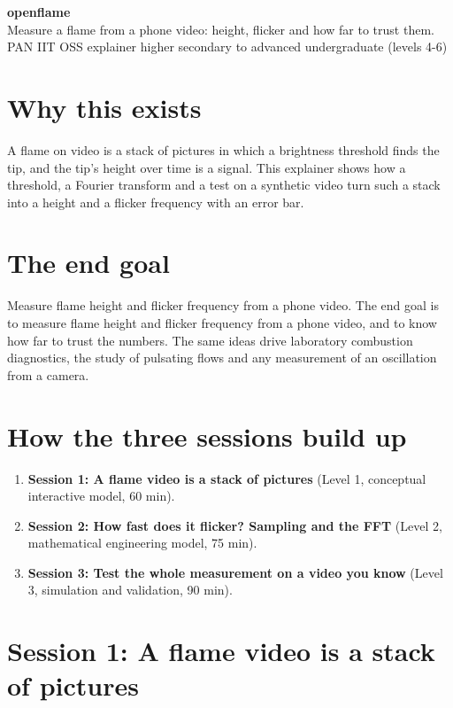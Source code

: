 \documentclass[11pt,a4paper]{article}
\begin{document}
\begin{center}{\LARGE\bfseries openflame}\\[0.4em]{\large Measure a flame from a phone video: height, flicker and how far to trust them.}\\[0.2em]\small PAN IIT OSS explainer \textbullet{} higher secondary to advanced undergraduate (levels 4-6)\end{center}

\section*{Why this exists}
A flame on video is a stack of pictures in which a brightness threshold finds the tip, and the tip's height over time is a signal. This explainer shows how a threshold, a Fourier transform and a test on a synthetic video turn such a stack into a height and a flicker frequency with an error bar.

\section*{The end goal}
Measure flame height and flicker frequency from a phone video. The end goal is to measure flame height and flicker frequency from a phone video, and to know how far to trust the numbers. The same ideas drive laboratory combustion diagnostics, the study of pulsating flows and any measurement of an oscillation from a camera.

\section*{How the three sessions build up}
\begin{enumerate}[nosep]
\item \textbf{Session 1: A flame video is a stack of pictures} (Level 1, conceptual interactive model, 60 min).
\item \textbf{Session 2: How fast does it flicker? Sampling and the FFT} (Level 2, mathematical engineering model, 75 min).
\item \textbf{Session 3: Test the whole measurement on a video you know} (Level 3, simulation and validation, 90 min).
\end{enumerate}

\section{Session 1: A flame video is a stack of pictures}
\end{document}
